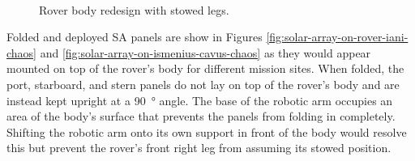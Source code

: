 \begin{figure}[h]
\begin{subfigure}[t]{\subfigureWidth}
		\label{fig:sub:rover-body-redesign-stowed-legs-after}
	\end{subfigure}\\[0.8ex]
    \caption[Rover body redesign with stowed legs]
            {Rover body redesign with stowed legs.}
    \label{fig:rover-body-redesign-stowed-legs}
\vspace{-2ex}
\end{figure}


Folded and deployed \ac{SA} panels are show in Figures \ref{fig:solar-array-on-rover-iani-chaos} and \ref{fig:solar-array-on-ismenius-cavus-chaos} as they would appear mounted on top of the rover's body for different mission sites. When folded, the port, starboard, and stern panels do not lay on top of the rover's body and are instead kept upright at a \SI{90}{\degree} angle. The base of the robotic arm occupies an area of the body's surface that prevents the panels from folding in completely. Shifting the robotic arm onto its own support in front of the body would resolve this but prevent the rover's front right leg from assuming its stowed position.

\vspace{0.5cm}

